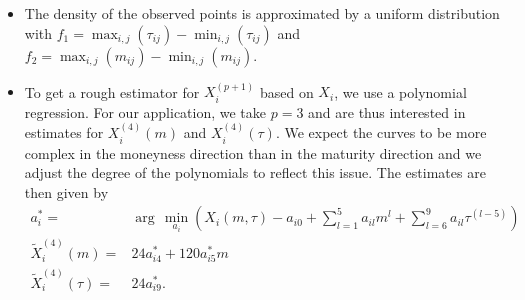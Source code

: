 \begin{itemize}
	\item The density of the observed points is approximated by a uniform distribution with $f_1= \max_{i,j}(\tau_{ij})- \min_{i,j}(\tau_{ij})$ and $f_2= \max_{i,j}(m_{ij})- \min_{i,j}(m_{ij})$.
	
		\item To get a rough estimator for $ X_i^{(p+1)}$ based on $X_i$, we use a polynomial regression.  %
For our application, we take $p=3$ and are thus interested in estimates for $X_i^{(4)}(m)$ and $X_i^{(4)}(\tau)$. We expect the curves to be more complex in the moneyness direction than in the maturity direction and we adjust the degree of the polynomials to reflect this issue. The estimates are then given by%
\begin{equation}
\begin{split}
a^*_i=&\operatorname{arg}\,\underset{a_i}{\operatorname{min}} \left( X_i(m,\tau) - a_{i0} + \sum_{l=1}^5 a_{il} m^l + \sum_{l=6}^{9} a_{il} \tau^{(l-5)} \right) \\
\tilde{X}_i^{(4)}(m)  = & 24 a^*_{i4} + 120 a^*_{i5} m  \\%
 \tilde{X}_i^{(4)}(\tau)  = & 24 a^*_{i9}.  %
 \end{split}
\end{equation}
		

\end{itemize}
